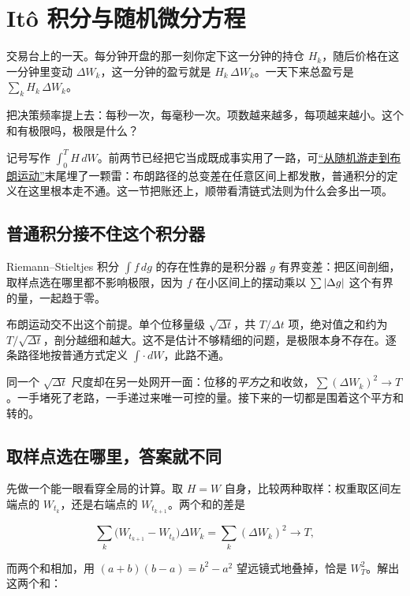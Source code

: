 \section{Itô 积分与随机微分方程}
\label{sec:06-Random-Processes/06-Diffusion-and-SDE/03}

交易台上的一天。每分钟开盘的那一刻你定下这一分钟的持仓 \(H_k\)，随后价格在这一分钟里变动 \(\Delta W_k\)，这一分钟的盈亏就是 \(H_k\,\Delta W_k\)。一天下来总盈亏是 \(\sum_k H_k\,\Delta W_k\)。

把决策频率提上去：每秒一次，每毫秒一次。项数越来越多，每项越来越小。这个和有极限吗，极限是什么？

记号写作 \(\int_{0}^{T} H\,dW\)。前两节已经把它当成既成事实用了一路，可\hyperref[sec:06-Random-Processes/06-Diffusion-and-SDE/01]{``从随机游走到布朗运动''}末尾埋了一颗雷：布朗路径的总变差在任意区间上都发散，普通积分的定义在这里根本走不通。这一节把账还上，顺带看清链式法则为什么会多出一项。

\subsection{普通积分接不住这个积分器}

Riemann--Stieltjes 积分 \(\int f\,dg\) 的存在性靠的是积分器 \(g\) 有界变差：把区间剖细，取样点选在哪里都不影响极限，因为 \(f\) 在小区间上的摆动乘以 \(\sum\left|\Delta g\right|\) 这个有界的量，一起趋于零。

布朗运动交不出这个前提。单个位移量级 \(\sqrt{\Delta t}\)，共 \(T/\Delta t\) 项，绝对值之和约为 \(T/\sqrt{\Delta t}\)，剖分越细和越大。这不是估计不够精细的问题，是极限本身不存在。逐条路径地按普通方式定义 \(\int\cdot\,dW\)，此路不通。

同一个 \(\sqrt{\Delta t}\) 尺度却在另一处网开一面：位移的\emph{平方}之和收敛，\(\sum(\Delta W_k)^2\to T\)。一手堵死了老路，一手递过来唯一可控的量。接下来的一切都是围着这个平方和转的。

\subsection{取样点选在哪里，答案就不同}

先做一个能一眼看穿全局的计算。取 \(H=W\) 自身，比较两种取样：权重取区间左端点的 \(W_{t_k}\)，还是右端点的 \(W_{t_{k+1}}\)。两个和的差是

\[
\sum_k\big(W_{t_{k+1}}-W_{t_k}\big)\Delta W_k=\sum_k(\Delta W_k)^2\longrightarrow T,
\]

而两个和相加，用 \((a+b)(b-a)=b^2-a^2\) 望远镜式地叠掉，恰是 \(W_T^2\)。解出这两个和：

